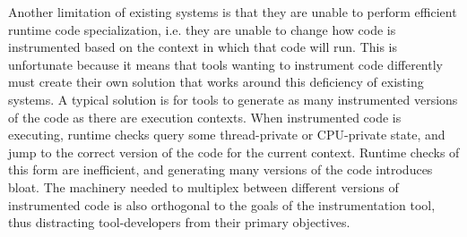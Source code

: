 \documentclass[preprint]{sigplanconf}
\begin{document}


Another limitation of existing systems is that they are unable to perform efficient runtime code specialization, i.e. they are unable to change how code is instrumented based on the context in which that code will run. This is unfortunate because it means that tools wanting to instrument code differently must create their own solution that works around this deficiency of existing systems. A typical solution is for tools to generate as many instrumented versions of the code as there are execution contexts. When instrumented code is  executing, runtime checks query some thread-private or CPU-private state, and jump to the correct version of the code for the current context. Runtime checks of this form are inefficient, and generating many versions of the code introduces bloat. The machinery needed to multiplex between different versions of instrumented code is also orthogonal to the goals of the instrumentation tool, thus distracting tool-developers from their primary objectives.

\end{document}
